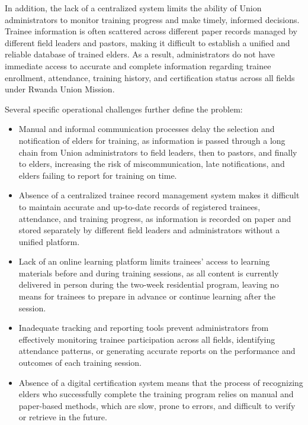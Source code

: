 \documentclass[12pt]{report}
\begin{document}
In addition, the lack of a centralized system limits the ability of Union administrators to monitor training progress and make timely, informed decisions. Trainee information is often scattered across different paper records managed by different field leaders and pastors, making it difficult to establish a unified and reliable database of trained elders. As a result, administrators do not have immediate access to accurate and complete information regarding trainee enrollment, attendance, training history, and certification status across all fields under Rwanda Union Mission.

Several specific operational challenges further define the problem:
\begin{itemize}
    \item Manual and informal communication processes delay the selection and notification of elders for training, as information is passed through a long chain from Union administrators to field leaders, then to pastors, and finally to elders, increasing the risk of miscommunication, late notifications, and elders failing to report for training on time.
    \item Absence of a centralized trainee record management system makes it difficult to maintain accurate and up-to-date records of registered trainees, attendance, and training progress, as information is recorded on paper and stored separately by different field leaders and administrators without a unified platform.
    \item Lack of an online learning platform limits trainees' access to learning materials before and during training sessions, as all content is currently delivered in person during the two-week residential program, leaving no means for trainees to prepare in advance or continue learning after the session.
    \item Inadequate tracking and reporting tools prevent administrators from effectively monitoring trainee participation across all fields, identifying attendance patterns, or generating accurate reports on the performance and outcomes of each training session.
    \item Absence of a digital certification system means that the process of recognizing elders who successfully complete the training program relies on manual and paper-based methods, which are slow, prone to errors, and difficult to verify or retrieve in the future.
\end{itemize}
\end{document}
